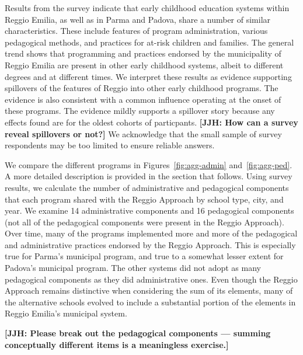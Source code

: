 Results from the survey indicate that early childhood education systems within Reggio Emilia, as well as in Parma and Padova, share a number of similar characteristics. These include features of program administration, various pedagogical methods, and practices for at-risk children and families. The general trend shows that programming and practices endorsed by the municipality of Reggio Emilia are present in other early childhood systems, albeit to different degrees and at different times. We interpret these results as evidence supporting spillovers of the features of Reggio into other early childhood programs. The evidence is also consistent with a common influence operating at the onset of these programs. The evidence mildly supports a spillover story because any effects found are for the oldest cohorts of particpants. \textbf{[JJH: How can a survey reveal spillovers or not?]} We acknowledge that the small sample of survey respondents may be too limited to ensure reliable answers.

We compare the different programs in Figures~\ref{fig:agg-admin} and~\ref{fig:agg-ped}. A more detailed description is provided in the section that follows. Using survey results, we calculate the number of administrative and pedagogical components that each program shared with the Reggio Approach by school type, city, and year. We examine 14 administrative components and 16 pedagogical components (not all of the pedagogical components were present in the Reggio Approach). Over time, many of the programs implemented more and more of the pedagogical and administrative practices endorsed by the Reggio Approach. This is especially true for Parma's municipal program, and true to a somewhat lesser extent for Padova's municipal program. The other systems did not adopt as many pedagogical components as they did administrative ones. Even though the Reggio Approach remains distinctive when considering the sum of its elements, many of the alternative schools evolved to include a substantial portion of the elements in Reggio Emilia's municipal system.

\textbf{[JJH: Please break out the pedagogical components --- summing conceptually different items is a meaningless exercise.]}


